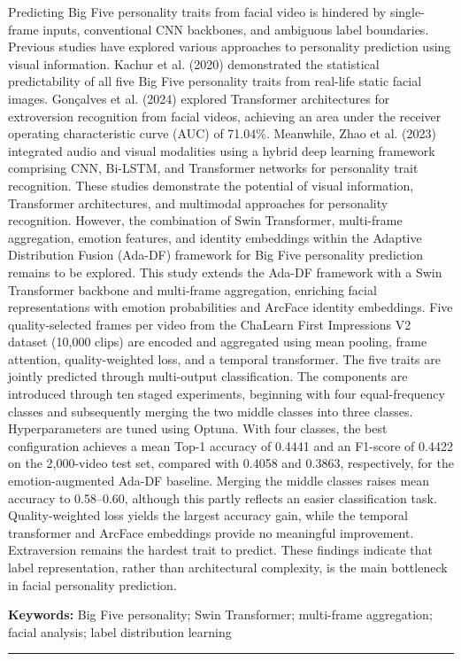 \documentclass[10pt,a4paper,twocolumn]{article}
\begin{document}
{\begin{minipage}{\textwidth}
{Predicting Big Five personality traits from facial video is hindered by single-frame inputs, conventional CNN backbones, and ambiguous label boundaries. Previous studies have explored various approaches to personality prediction using visual information. Kachur et al. (2020) demonstrated the statistical predictability of all five Big Five personality traits from real-life static facial images. Gonçalves et al. (2024) explored Transformer architectures for extroversion recognition from facial videos, achieving an area under the receiver operating characteristic curve (AUC) of 71.04\%. Meanwhile, Zhao et al. (2023) integrated audio and visual modalities using a hybrid deep learning framework comprising CNN, Bi-LSTM, and Transformer networks for personality trait recognition. These studies demonstrate the potential of visual information, Transformer architectures, and multimodal approaches for personality recognition. However, the combination of Swin Transformer, multi-frame aggregation, emotion features, and identity embeddings within the Adaptive Distribution Fusion (Ada-DF) framework for Big Five personality prediction remains to be explored. This study extends the Ada-DF framework with a Swin Transformer backbone and multi-frame aggregation, enriching facial representations with emotion probabilities and ArcFace identity embeddings. Five quality-selected frames per video from the ChaLearn First Impressions V2 dataset (10,000 clips) are encoded and aggregated using mean pooling, frame attention, quality-weighted loss, and a temporal transformer. The five traits are jointly predicted through multi-output classification. The components are introduced through ten staged experiments, beginning with four equal-frequency classes and subsequently merging the two middle classes into three classes. Hyperparameters are tuned using Optuna. With four classes, the best configuration achieves a mean Top-1 accuracy of 0.4441 and an F1-score of 0.4422 on the 2,000-video test set, compared with 0.4058 and 0.3863, respectively, for the emotion-augmented Ada-DF baseline. Merging the middle classes raises mean accuracy to 0.58–0.60, although this partly reflects an easier classification task. Quality-weighted loss yields the largest accuracy gain, while the temporal transformer and ArcFace embeddings provide no meaningful improvement. Extraversion remains the hardest trait to predict. These findings indicate that label representation, rather than architectural complexity, is the main bottleneck in facial personality prediction.
\par}
\vspace{4pt}
{\fontsize{9}{11}\selectfont\noindent
 \textbf{Keywords:} Big Five personality; Swin Transformer; multi-frame aggregation; facial analysis; label distribution learning\par}
\end{minipage}
\par\vspace{4pt}\noindent\rule{\textwidth}{0.4pt}\par\vspace{4pt}

}
\end{document}
